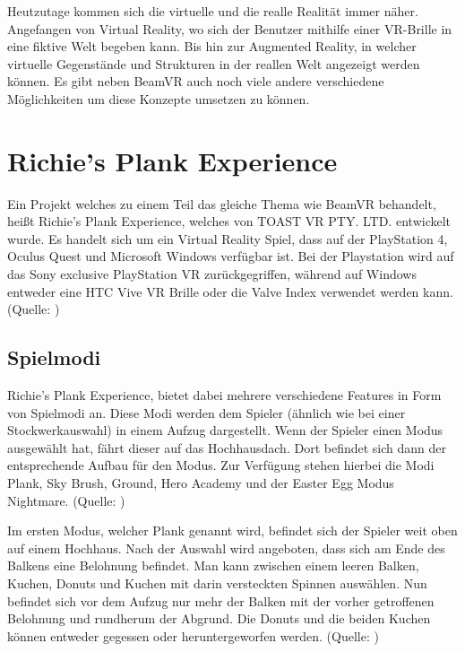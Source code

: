 %

Heutzutage kommen sich die virtuelle und die realle Realität immer näher.
Angefangen von Virtual Reality, wo sich der Benutzer mithilfe einer VR-Brille in eine fiktive Welt begeben kann.
Bis hin zur Augmented Reality, in welcher virtuelle Gegenstände und Strukturen in der reallen Welt angezeigt werden können.
Es gibt neben BeamVR auch noch viele andere verschiedene Möglichkeiten um diese Konzepte umsetzen zu können.



\section{Richie's Plank Experience}
Ein Projekt welches zu einem Teil das gleiche Thema wie BeamVR behandelt, heißt Richie's Plank Experience, welches von TOAST VR PTY. LTD. entwickelt wurde.
Es handelt sich um ein Virtual Reality Spiel, dass auf der PlayStation 4, Oculus Quest und Microsoft Windows verfügbar ist.
Bei der Playstation wird auf das Sony exclusive PlayStation VR zurückgegriffen, während auf Windows entweder eine HTC Vive VR Brille oder die Valve Index verwendet werden kann.
(Quelle: \cite{ToastGames_2021})

\subsection{Spielmodi}
Richie's Plank Experience, bietet dabei mehrere verschiedene Features in Form von Spielmodi an.
Diese Modi werden dem Spieler (ähnlich wie bei einer Stockwerkauswahl) in einem Aufzug dargestellt.
Wenn der Spieler einen Modus ausgewählt hat, fährt dieser auf das Hochhausdach.
Dort befindet sich dann der entsprechende Aufbau für den Modus.
Zur Verfügung stehen hierbei die Modi Plank, Sky Brush, Ground, Hero Academy und der Easter Egg Modus Nightmare.
(Quelle: \cite{ToastGamesSteamPage_2021})

Im ersten Modus, welcher Plank genannt wird, befindet sich der Spieler weit oben auf einem Hochhaus.
Nach der Auswahl wird angeboten, dass sich am Ende des Balkens eine Belohnung befindet.
Man kann zwischen einem leeren Balken, Kuchen, Donuts und Kuchen mit darin versteckten Spinnen auswählen.
Nun befindet sich vor dem Aufzug nur mehr der Balken mit der vorher getroffenen Belohnung und rundherum der Abgrund.
Die Donuts und die beiden Kuchen können entweder gegessen oder heruntergeworfen werden.
(Quelle: \cite{ToastGamesSteamPage_2021})

